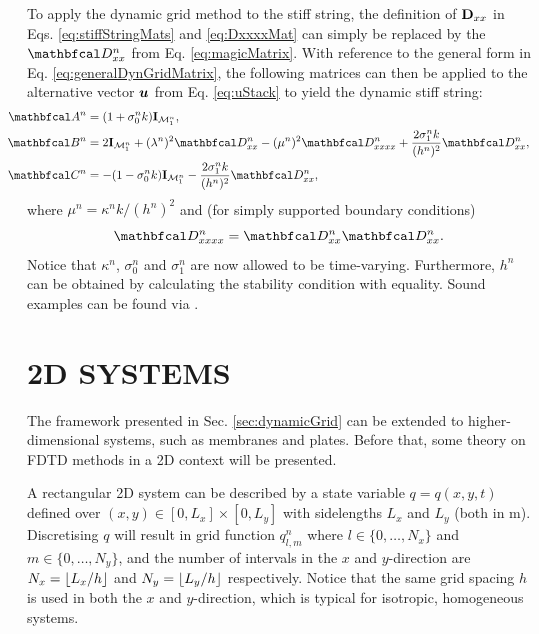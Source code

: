 \documentclass[fleqn]{jaes}
\begin{document}
To apply the dynamic grid method to the stiff string, the definition of $\mathbf{D}_{xx}$ in Eqs. \eqref{eq:stiffStringMats} and \eqref{eq:DxxxxMat} can simply be replaced by the $\DDxx$ from Eq. \eqref{eq:magicMatrix}. With reference to the general form in Eq. \eqref{eq:generalDynGridMatrix}, the following matrices can then be applied to the alternative vector $\boldsymbol{u}$ from Eq. \eqref{eq:uStack} to yield the dynamic stiff string:
\begin{equation}\label{eq:stiffStringDynMatrix}
\begin{aligned}
    \!\!\!\!\!\!\!\!\!\!\AA &= (1 + \sigma_0^nk)\I_{\MoneD},\\
    \!\!\!\!\!\!\!\!\!\!\BB &= 2\I_{\MoneD} + (\lambda^n)^2 \DDxx - (\mu^n)^2 \DDxxxx + \frac{2\sigma_1^nk}{(h^n)^2}\DDxx,\\
    \!\!\!\!\!\!\!\!\!\!\CC &= -(1 - \sigma_0^nk)\I_{\MoneD} - \frac{2\sigma_1^nk}{(h^n)^2}\DDxx,
\end{aligned}
\end{equation}
where $\mu^n = \kappa^n k/(h^n)^2$ and (for simply supported boundary conditions) 
\begin{equation}\label{eq:4thOrder1D}
    \DDxxxx = \DDxx\DDxx.
\end{equation}
Notice that $\kappa^n$, $\sigma_0^n$ and $\sigma_1^n$ are now allowed to be time-varying. Furthermore, $h^n$ can be obtained by calculating the stability condition with equality. %
Sound examples can be found via \cite{soundExamples}.

\section{2D SYSTEMS}\label{sec:2D}
The framework presented in Sec. \ref{sec:dynamicGrid} can be extended to higher-dimensional systems, such as membranes and plates. Before that, some theory on FDTD methods in a 2D context will be presented.

A rectangular 2D system can be described by a state variable $q = q(x,y,t)$ defined over $(x ,y) \in [0, L_x] \times [0, L_y]$ with sidelengths $L_x$ and $L_y$ (both in m). Discretising $q$ will result in grid function $q_{l,m}^n$ where $l \in \{0, \hdots, N_x\}$ and $m \in \{0, \hdots, N_y\}$, and the number of intervals in the $x$ and $y$-direction are $N_x = \floor[L_x/h]$ and $N_y = \floor[L_y/h]$ respectively. Notice that the same grid spacing $h$ is used in both the $x$ and $y$-direction, which is typical for isotropic, homogeneous systems.
\end{document}
